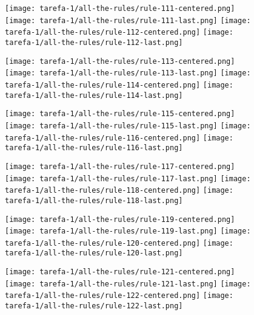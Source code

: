\begin{figure}[htbp]
  \centering
\texttt{[image: tarefa-1/all-the-rules/rule-111-centered.png]}
\texttt{[image: tarefa-1/all-the-rules/rule-111-last.png]}
\texttt{[image: tarefa-1/all-the-rules/rule-112-centered.png]}
\texttt{[image: tarefa-1/all-the-rules/rule-112-last.png]}
\end{figure}
\begin{figure}[htbp]
  \centering
\texttt{[image: tarefa-1/all-the-rules/rule-113-centered.png]}
\texttt{[image: tarefa-1/all-the-rules/rule-113-last.png]}
\texttt{[image: tarefa-1/all-the-rules/rule-114-centered.png]}
\texttt{[image: tarefa-1/all-the-rules/rule-114-last.png]}
\end{figure}
\begin{figure}[htbp]
  \centering
\texttt{[image: tarefa-1/all-the-rules/rule-115-centered.png]}
\texttt{[image: tarefa-1/all-the-rules/rule-115-last.png]}
\texttt{[image: tarefa-1/all-the-rules/rule-116-centered.png]}
\texttt{[image: tarefa-1/all-the-rules/rule-116-last.png]}
\end{figure}
\begin{figure}[htbp]
  \centering
\texttt{[image: tarefa-1/all-the-rules/rule-117-centered.png]}
\texttt{[image: tarefa-1/all-the-rules/rule-117-last.png]}
\texttt{[image: tarefa-1/all-the-rules/rule-118-centered.png]}
\texttt{[image: tarefa-1/all-the-rules/rule-118-last.png]}
\end{figure}
\begin{figure}[htbp]
  \centering
\texttt{[image: tarefa-1/all-the-rules/rule-119-centered.png]}
\texttt{[image: tarefa-1/all-the-rules/rule-119-last.png]}
\texttt{[image: tarefa-1/all-the-rules/rule-120-centered.png]}
\texttt{[image: tarefa-1/all-the-rules/rule-120-last.png]}
\end{figure}
\begin{figure}[htbp]
  \centering
\texttt{[image: tarefa-1/all-the-rules/rule-121-centered.png]}
\texttt{[image: tarefa-1/all-the-rules/rule-121-last.png]}
\texttt{[image: tarefa-1/all-the-rules/rule-122-centered.png]}
\texttt{[image: tarefa-1/all-the-rules/rule-122-last.png]}
\end{figure}
